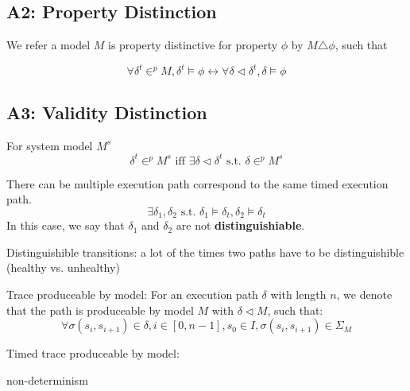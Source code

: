 \documentclass{llncs}
\begin{document}
\subsection{A2: Property Distinction}
We refer a model $M$ is property distinctive for property $\phi$ by $M\triangle\phi$, such that

$$\forall \delta^t\in^p M, \delta^t\models\phi\leftrightarrow\forall \delta\triangleleft\delta^t,  \delta\models\phi$$

\subsection{A3: Validity Distinction}


For system model $M^s$
$$\delta^t\in^p M^s \text{ iff }\exists\delta\triangleleft\delta^t\text{ s.t. } \delta\in^p M^s$$


There can be multiple execution path correspond to the same timed execution path. 
$$\exists \delta_1,\delta_2\text{ s.t. } \delta_1\models\delta_t,\delta_2\models\delta_t$$
In this case, we say that $\delta_1$ and $\delta_2$ are not \textbf{distinguishiable}. 

Distinguishible transitions: a lot of the times two paths have to be distinguishible (healthy vs. unhealthy)


Trace produceable by model: For an execution path $\delta$ with length $n$, we denote that the path is produceable by model $M$ with $\delta\triangleleft M$, such that:
$$\forall \sigma(s_i,s_{i+1})\in \delta,i\in[0,n-1], s_0\in I, \sigma(s_i,s_{i+1})\in\Sigma_M$$

Timed trace produceable by model:


non-determinism
\end{document}
